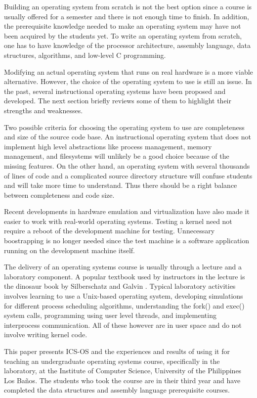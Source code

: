 \documentclass{acm_proc_article-sp}
\begin{document}
Building an operating system from scratch is not the best option since a course
is usually offered for a semester and there is not enough time to finish. In 
addition, the prerequisite knowledge needed to make an operating system may have
not been acquired by the students yet. To write an operating system from 
scratch, one has to have knowledge of the processor architecture, assembly
language, data structures, algorithms, and low-level C programming.

Modifying an actual operating system that runs on real hardware is a more
viable alternative. However, the choice of the operating system to use is
still an issue. In the past, several instructional operating systems have been
proposed and developed. The next section briefly reviews some of them 
to highlight their strengths and weaknesses.

Two possible criteria for choosing the operating system to use are completeness 
and size of the source code base. An instructional operating system that does
not implement high level abstractions like process management, memory 
management, and filesystems will unlikely be a good choice because
of the missing features. On the other hand, an operating system with several 
thousands of lines of code and a complicated source directory structure will
confuse students and will take more time to understand. Thus there should
be a right balance between completeness and code size.

Recent developments in hardware emulation and virtualization have also made it 
easier to work with real-world operating systems. Testing a kernel need not
require a reboot of the development machine for testing. Unnecessary 
boostrapping is no longer needed since the test machine is a software
application running on the development machine itself.
 
The delivery of an operating systems course is usually through a
lecture and a laboratory component. A popular textbook used by instructors in
the lecture is the dinosaur book by Silberschatz and Galvin 
\cite{silberschatz:osc}. Typical laboratory activities involves learning to 
use a Unix-based operating system, developing simulations for different process
scheduling algorithms, understanding the fork() and exec() system calls, 
programming using user level threads, and implementing interprocess
communication. All of these however are in user space and do not involve 
writing kernel code.

This paper presents ICS-OS and the experiences and results of using it for 
teaching an undergraduate operating systems course, specifically in the
laboratory, at the Institute of Computer Science, University of the Philippines
Los Ba\~nos. The students who took the course are in their third year and
have completed the data structures and assembly language prerequisite courses.
\end{document}
